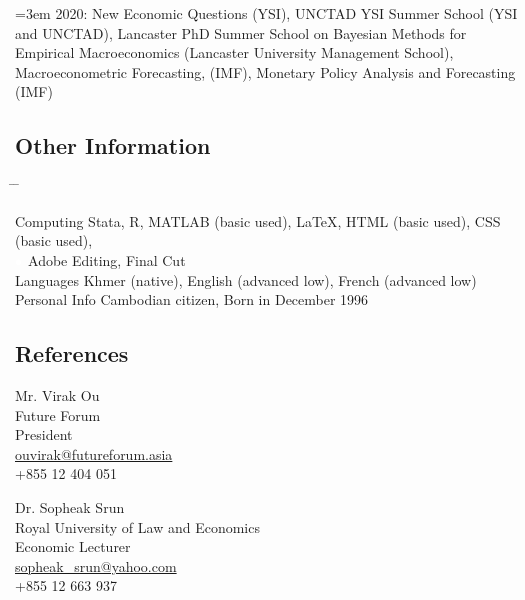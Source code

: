 \documentclass[10pt,a4paper]{article}
\newcommand{\tabbedblock}[1]{

	\begin{tabbing}
		\hspace{3cm} \= \hspace{4cm} \= \kill
		#1
	\end{tabbing}
}
\begin{document}
\hangindent=3em
	2020: New Economic Questions (YSI), UNCTAD YSI Summer School (YSI and UNCTAD), Lancaster PhD Summer School on Bayesian Methods for Empirical Macroeconomics (Lancaster University Management School), Macroeconometric Forecasting, (IMF), Monetary Policy Analysis and Forecasting (IMF)

\subsection*{Other Information}

\tabbedblock{
	Computing \> Stata, R, MATLAB (basic used), \LaTeX, HTML (basic used), CSS (basic used), \\
	\> $\color{white}{\bullet}$ Adobe Editing, Final Cut\\

	Languages \> Khmer (native), English (advanced low), French (advanced low)\\
	
	Personal Info \> Cambodian citizen, Born in December 1996
}

\subsection*{References}		
\parbox{0.5\textwidth}{ %
	Mr. Virak Ou\\ 
	Future Forum\\ 
	President\\
	\href{mailto: ouvirak@futureforum.asia}{ouvirak@futureforum.asia}\\
	+855 12 404 051
}
\hfill %
\parbox{0.5\textwidth}{ %
	Dr. Sopheak Srun  \\ 
	Royal University of Law and Economics \\ 
	Economic Lecturer\\
	\href{mailto: sopheak_srun@yahoo.com}{sopheak\_srun@yahoo.com}\\
	+855 12 663 937\\
}

\vspace{1.5em}
\end{document}
